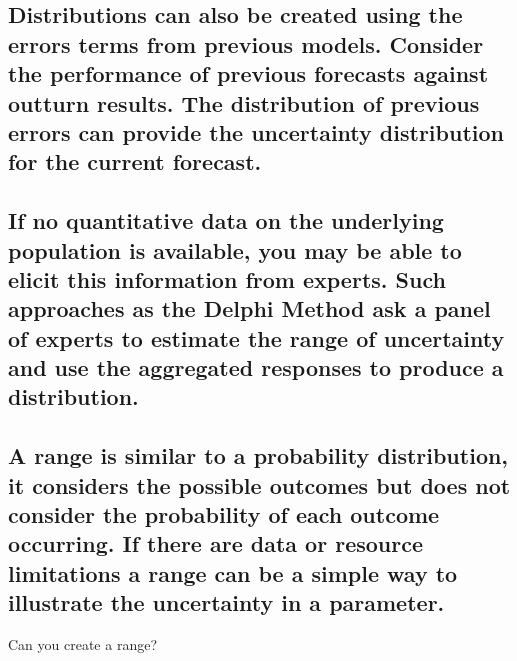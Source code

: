 \documentclass[]{book}
\begin{document}
\subsection{Distributions can also be created using the errors terms
from previous models. Consider the performance of previous forecasts
against outturn results. The distribution of previous errors can provide
the uncertainty distribution for the current
forecast.}\label{distributions-can-also-be-created-using-the-errors-terms-from-previous-models.-consider-the-performance-of-previous-forecasts-against-outturn-results.-the-distribution-of-previous-errors-can-provide-the-uncertainty-distribution-for-the-current-forecast.}

\subsection{If no quantitative data on the underlying population is
available, you may be able to elicit this information from experts. Such
approaches as the Delphi Method ask a panel of experts to estimate the
range of uncertainty and use the aggregated responses to produce a
distribution.}\label{if-no-quantitative-data-on-the-underlying-population-is-available-you-may-be-able-to-elicit-this-information-from-experts.-such-approaches-as-the-delphi-method-ask-a-panel-of-experts-to-estimate-the-range-of-uncertainty-and-use-the-aggregated-responses-to-produce-a-distribution.}

\subsection{A range is similar to a probability distribution, it
considers the possible outcomes but does not consider the probability of
each outcome occurring. If there are data or resource limitations a
range can be a simple way to illustrate the uncertainty in a
parameter.}\label{a-range-is-similar-to-a-probability-distribution-it-considers-the-possible-outcomes-but-does-not-consider-the-probability-of-each-outcome-occurring.-if-there-are-data-or-resource-limitations-a-range-can-be-a-simple-way-to-illustrate-the-uncertainty-in-a-parameter.}

 Can you create a range?
\end{document}
